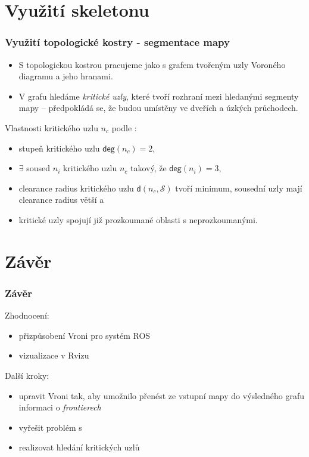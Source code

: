 \documentclass[notes=false,pdftex]{beamer}
\begin{document}
\section{Využití skeletonu}
\begin{frame}
	\frametitle{Využití topologické kostry - segmentace mapy}

	\begin{itemize}
		\item S topologickou kostrou pracujeme jako s grafem tvořeným
			uzly Voroného diagramu a jeho hranami.
		\item V grafu hledáme \emph{kritické uzly}, které tvoří rozhraní
			mezi hledanými segmenty mapy -- předpokládá se, že budou umístěny
			ve dveřích a úzkých průchodech.
	\end{itemize}
	\begin{block}{Vlastnosti kritického uzlu $n_c$ podle \cite{Wurm2008Coordinated}:}
		\begin{itemize}
			\item stupeň kritického uzlu $\mathsf{deg}(n_c) = 2$,
			\item $\exists$ soused $n_i$ kritického uzlu $n_c$ takový, že $\mathsf{deg}(n_i) = 3$,
			\item clearance radius kritického uzlu $\mathsf{d}(n_c,\mathcal{S})$ tvoří minimum,
				sousední uzly mají clearance radius větší a 
			\item kritické uzly spojují již prozkoumané oblasti s neprozkoumanými.
		\end{itemize}
	\end{block}

\end{frame}


\section{Závěr}
\begin{frame}
	\frametitle{Závěr}

	\begin{block}{Zhodnocení:}
		\begin{itemize}
			\item přizpůsobení Vroni pro systém ROS
			\item vizualizace v Rvizu
		\end{itemize}
	\end{block}
	\begin{block}{Další kroky:}
		\begin{itemize}
			\item upravit Vroni tak, aby umožnilo přenést ze vstupní mapy
				do výsledného grafu informaci o \emph{frontierech}
			\item vyřešit problém s 
			\item realizovat hledání kritických uzlů
		\end{itemize}
	\end{block}

\end{frame}
\end{document}
